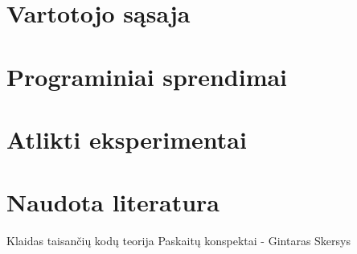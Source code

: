 \documentclass[oneside]{VUMIFPSkursinis}
\begin{document}
\section{Vartotojo sąsaja}

\section{Programiniai sprendimai}
\section{Atlikti eksperimentai}
\section{Naudota literatura}
	Klaidas taisančių kodų teorija Paskaitų konspektai - Gintaras Skersys
\end{document}
